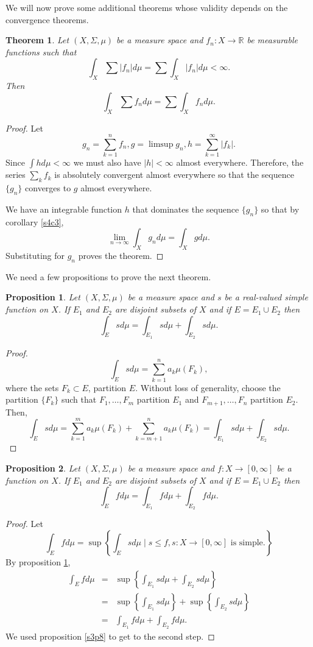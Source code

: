 \documentclass{article}
\newcommand{\sor}{\mathbb{R}}
\theoremstyle{plain}
\newtheorem{thm}{Theorem}
\numberwithin{thm}{section}
\theoremstyle{plain}
\newtheorem{prop}{Proposition}
\numberwithin{prop}{section}
\theoremstyle{definition}
\numberwithin{defn}{section}
\theoremstyle{remark}
\theoremstyle{plain}
\numberwithin{cor}{section}
\numberwithin{equation}{section}
\begin{document}
We will now prove some additional theorems whose validity depends on the convergence
theorems.
\begin{thm}\label{s4t5}
Let $(X, \Sigma, \mu)$ be a measure space and $f_n: X \rightarrow \sor$ be measurable
functions such that
\[
\int_X\sum|f_n| d\mu= \sum\int_X |f_n| d\mu < \infty.
\]
Then
\[
\int_X\sum f_n d\mu= \sum\int_X f_n d\mu.
\]
\end{thm}
\begin{proof}
Let 
\[
g_n = \sum_{k=1}^n f_n, g = \limsup g_n, h = \sum_{k=1}^\infty |f_k|.
\]
Since $\int h d\mu < \infty$ we must also have $|h| < \infty$ almost everywhere.
Therefore, the series $\sum_k f_k$ is absolutely convergent almost everywhere so
that the sequence $\{g_n\}$ converges to $g$ almost everywhere.

We have an integrable function $h$ that dominates the sequence $\{g_n\}$ so that
by corollary \ref{s4c3},
\[
\lim_{n \rightarrow \infty}\int_X g_n d\mu = \int_X gd\mu.
\]
Substituting for $g_n$ proves the theorem.
\end{proof}

We need a few propositions to prove the next theorem.
\begin{prop}\label{s4p4}
Let $(X, \Sigma, \mu)$ be a measure space and $s$ be a real-valued simple function
on $X$. If $E_1$ and $E_2$ are disjoint subsets of $X$ and if $E = E_1 \cup E_2$
then
\[
\int_E sd\mu = \int_{E_1} sd\mu + \int_{E_2}sd\mu.
\]
\end{prop}
\begin{proof}
\[
\int_E sd\mu = \sum_{k=1}^n a_k\mu(F_k),
\]
where the sets $F_k \subset E$, partition $E$. Without loss of generality, choose
the partition $\{F_k\}$ such that $F_1, \ldots, F_m$ partition $E_1$ and $F_{m+1},
\ldots, F_n$ partition $E_2$. Then,
\[
\int_E sd\mu = \sum_{k=1}^m a_k\mu(F_k) + \sum_{k=m+1}^n a_k\mu(F_k) =
\int_{E_1}sd\mu + \int_{E_2}sd\mu.
\]
\end{proof}

\begin{prop}\label{s4p5}
Let $(X, \Sigma, \mu)$ be a measure space and $f: X \rightarrow [0, \infty]$ be
a function on $X$. If $E_1$ and $E_2$ are disjoint subsets of $X$ and if $E = 
E_1 \cup E_2$ then
\[
\int_E fd\mu = \int_{E_1} fd\mu + \int_{E_2}fd\mu.
\]
\end{prop}
\begin{proof}
Let
\[
\int_E fd\mu = \sup\left\{\int_E sd\mu\;\Big|\; s \le f, s:X \rightarrow [0, \infty] 
\text{ is simple.}\right\}
\]
By proposition \ref{s4p4},
\begin{eqnarray*}
\int_E fd\mu &=& \sup\left\{\int_{E_1}sd\mu + \int_{E_2}sd\mu\right\} \\
 &=& \sup\left\{\int_{E_1}sd\mu\right\} + \sup\left\{\int_{E_2}sd\mu\right\} \\
 &=& \int_{E_1} fd\mu + \int_{E_2}fd\mu.
\end{eqnarray*}
We used proposition \ref{s3p8} to get to the second step.
\end{proof}
\end{document}
